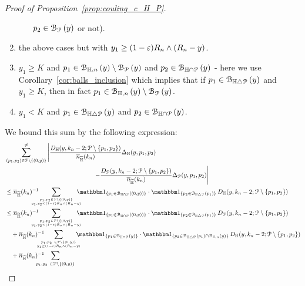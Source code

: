 \begin{proof}[Proof of Proposition~\ref{prop:couling_c_H_P}]
\begin{enumerate}
\begin{enumerate}
$p_2 \in {\mathcal B}_{{\mathcal P}}\left(y\right)$ or not).
\end{enumerate}
\item the above cases but with $y_1 \geq (1-\varepsilon) R_n \wedge (R_n -y)$. 
\item $y_1 \geq K$ and $p_1 \in {\mathcal B}_{\mathbb{H},n}\left(y\right) \setminus 
{\mathcal B}_{{\mathcal P}}\left(y\right)$ and $p_2 \in {\mathcal B}_{\mathbb{H} \cap {\mathcal P}}\left(y\right)$ - here we use 
Corollary~\ref{cor:balls_inclusion} which implies that if $p_1 \in {\mathcal B}_{\mathbb{H} \bigtriangleup {\mathcal P}}\left(y\right)$ and $y_1 \geq K$, then in fact $p_1 \in {\mathcal B}_{\mathbb{H},n}\left(y\right) \setminus {\mathcal B}_{{\mathcal P}}\left(y\right)$. 
\item $y_1 < K$ and $p_1 \in {\mathcal B}_{\mathbb{H} \bigtriangleup {\mathcal P}}\left(y\right)$ and $p_2 \in {\mathcal B}_{\mathbb{H} \cap {\mathcal P}}\left(y\right)$. 
\end{enumerate}
We bound this sum by the following expression:
\begin{align} 
&\sum_{(p_1,p_2) \in \Pcal \setminus \{(0,y)\}}^{\not =} 
  \left| \frac{D_{\H}(y,k_n-2; \Pcal \setminus \{p_1,p_2 \})}{\expH} \Delta_\H (y,p_1,p_2) \right. \notag \\
  & \hspace{5cm} \left. - \frac{D_{\Pcal} (y,k_n-2;\Pcal \setminus \{p_1,p_2\})}{\expH} \Delta_{\Pcal} (y,p_1,p_2)
   \right|  \notag \\
&\le \expH^{-1} \hspace{-15pt} \sum_{p_1,p_2\in \Pcal \setminus \{(0,y)\} \atop  y_1, y_2 < (1-\eps)R_n \wedge (R_n-y)} 
	\hspace{-10pt} \ind{p_1 \in \BallInter{(0,y)}} \cdot \ind{p_2 \in \BallSym{p_1}} 
	\, D_\H (y,k_n-2;\Pcal \setminus \{ p_1,p_2\}) \label{eq:sum_1}\\
&\le \expH^{-1} \hspace{-15pt} \sum_{p_1,p_2\in \Pcal \setminus \{(0,y)\} \atop  y_1, y_2 < (1-\eps)R_n \wedge (R_n-y)} 
	\hspace{-10pt} \ind{p_1 \in \BallInter{(0,y)}} \cdot \ind{p_2 \in \BallSym{p_1}} 
	\, D_\Pcal (y,k_n-2;\Pcal \setminus \{ p_1,p_2\}) \label{eq:sum_2}\\
&\hspace{10pt}+ \expH^{-1} \hspace{-15pt} \sum_{p_1,p_2 \ \in \Pcal \setminus \{(0,y) \} 
	\atop y_1 \geq (1-\eps) R_n \wedge (R_n-y)} \hspace{-10pt}
	\ind{p_1 \in \BallInter{y}} \cdot \ind{p_2 \in \BallSym{p_1}\cap \BallHyp{y}} 
	\, D_\H (y,k_n-2;\Pcal \setminus \{ p_1,p_2\}) \label{eq:sum_3} \\
&\hspace{10pt}+ \expH^{-1} \hspace{-15pt} \sum_{p_1,p_2 \ \in \Pcal \setminus \{(0,y) \} 
}
\end{align}
\end{proof}
